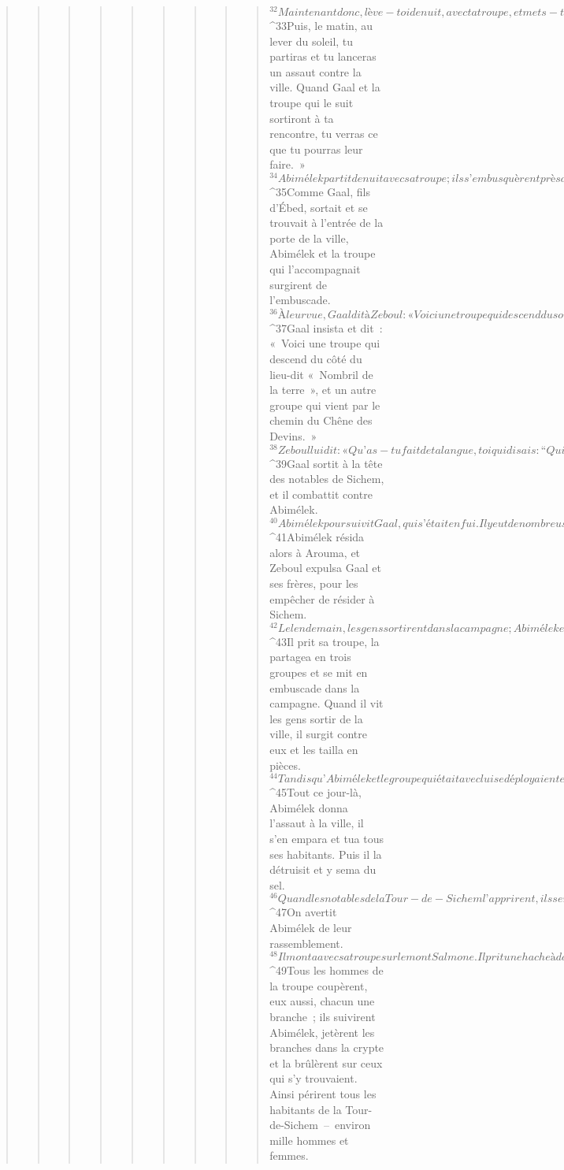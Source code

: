 \begin{verse}
\begin{verse}
\begin{verse}
\begin{verse}
\begin{verse}
\begin{verse}
\begin{verse}
\begin{verse}
\begin{verse}
${}^{32}Maintenant donc, lève-toi de nuit, avec ta troupe, et mets-toi en embuscade dans la campagne. 
${}^{33}Puis, le matin, au lever du soleil, tu partiras et tu lanceras un assaut contre la ville. Quand Gaal et la troupe qui le suit sortiront à ta rencontre, tu verras ce que tu pourras leur faire. »
${}^{34}Abimélek partit de nuit avec sa troupe ; ils s’embusquèrent près de Sichem, en se divisant en quatre groupes. 
${}^{35}Comme Gaal, fils d’Ébed, sortait et se trouvait à l’entrée de la porte de la ville, Abimélek et la troupe qui l’accompagnait surgirent de l’embuscade. 
${}^{36}À leur vue, Gaal dit à Zeboul : « Voici une troupe qui descend du sommet des montagnes ! » Zeboul lui dit : « C’est l’ombre des montagnes que tu prends pour des hommes ! » 
${}^{37}Gaal insista et dit : « Voici une troupe qui descend du côté du lieu-dit « Nombril de la terre », et un autre groupe qui vient par le chemin du Chêne des Devins. » 
${}^{38}Zeboul lui dit : « Qu’as-tu fait de ta langue, toi qui disais : “Qui est Abimélek pour que nous le servions ?” N’est-ce pas la troupe que tu méprisais ? Sors donc maintenant, et attaque-le ! »
${}^{39}Gaal sortit à la tête des notables de Sichem, et il combattit contre Abimélek. 
${}^{40}Abimélek poursuivit Gaal, qui s’était enfui. Il y eut de nombreuses victimes à l’entrée de la porte. 
${}^{41}Abimélek résida alors à Arouma, et Zeboul expulsa Gaal et ses frères, pour les empêcher de résider à Sichem.
${}^{42}Le lendemain, les gens sortirent dans la campagne ; Abimélek en fut informé. 
${}^{43}Il prit sa troupe, la partagea en trois groupes et se mit en embuscade dans la campagne. Quand il vit les gens sortir de la ville, il surgit contre eux et les tailla en pièces. 
${}^{44}Tandis qu’Abimélek et le groupe qui était avec lui se déployaient et prenaient position à l’entrée de la porte de la ville, les deux autres groupes se déployaient contre tous ceux qui étaient dans la campagne, et les taillaient en pièces. 
${}^{45}Tout ce jour-là, Abimélek donna l’assaut à la ville, il s’en empara et tua tous ses habitants. Puis il la détruisit et y sema du sel. 
${}^{46}Quand les notables de la Tour-de-Sichem l’apprirent, ils se rendirent dans la crypte du temple d’El-Berith. 
${}^{47}On avertit Abimélek de leur rassemblement. 
${}^{48}Il monta avec sa troupe sur le mont Salmone. Il prit une hache à double tranchant, coupa une branche d’arbre, la prit et la mit sur son épaule. Il dit à la troupe qui était avec lui : « Ce que vous m’avez vu faire, hâtez-vous de le faire comme moi. » 
${}^{49}Tous les hommes de la troupe coupèrent, eux aussi, chacun une branche ; ils suivirent Abimélek, jetèrent les branches dans la crypte et la brûlèrent sur ceux qui s’y trouvaient. Ainsi périrent tous les habitants de la Tour-de-Sichem – environ mille hommes et femmes.

\end{verse}
\end{verse}
\end{verse}
\end{verse}
\end{verse}
\end{verse}
\end{verse}
\end{verse}
\end{verse}

